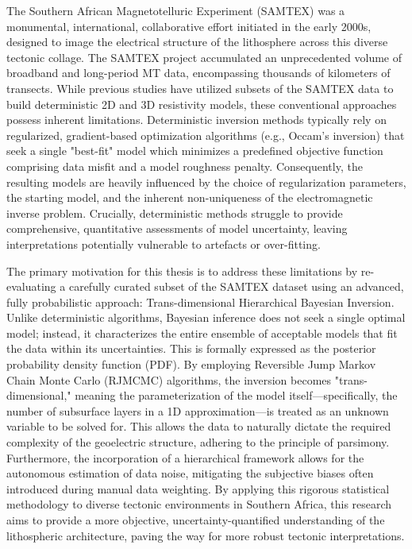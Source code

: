 The Southern African Magnetotelluric Experiment (SAMTEX) was a monumental, international, collaborative effort initiated in the early 2000s, designed to image the electrical structure of the lithosphere across this diverse tectonic collage. The SAMTEX project accumulated an unprecedented volume of broadband and long-period MT data, encompassing thousands of kilometers of transects. While previous studies have utilized subsets of the SAMTEX data to build deterministic 2D and 3D resistivity models, these conventional approaches possess inherent limitations. Deterministic inversion methods typically rely on regularized, gradient-based optimization algorithms (e.g., Occam's inversion) that seek a single "best-fit" model which minimizes a predefined objective function comprising data misfit and a model roughness penalty. Consequently, the resulting models are heavily influenced by the choice of regularization parameters, the starting model, and the inherent non-uniqueness of the electromagnetic inverse problem. Crucially, deterministic methods struggle to provide comprehensive, quantitative assessments of model uncertainty, leaving interpretations potentially vulnerable to artefacts or over-fitting.

The primary motivation for this thesis is to address these limitations by re-evaluating a carefully curated subset of the SAMTEX dataset using an advanced, fully probabilistic approach: Trans-dimensional Hierarchical Bayesian Inversion. Unlike deterministic algorithms, Bayesian inference does not seek a single optimal model; instead, it characterizes the entire ensemble of acceptable models that fit the data within its uncertainties. This is formally expressed as the posterior probability density function (PDF). By employing Reversible Jump Markov Chain Monte Carlo (RJMCMC) algorithms, the inversion becomes "trans-dimensional," meaning the parameterization of the model itself—specifically, the number of subsurface layers in a 1D approximation—is treated as an unknown variable to be solved for. This allows the data to naturally dictate the required complexity of the geoelectric structure, adhering to the principle of parsimony. Furthermore, the incorporation of a hierarchical framework allows for the autonomous estimation of data noise, mitigating the subjective biases often introduced during manual data weighting. By applying this rigorous statistical methodology to diverse tectonic environments in Southern Africa, this research aims to provide a more objective, uncertainty-quantified understanding of the lithospheric architecture, paving the way for more robust tectonic interpretations.

